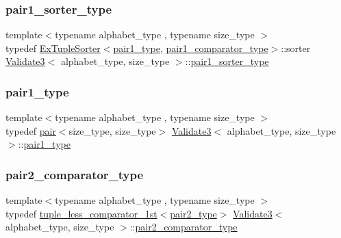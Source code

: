 \mbox{\label{class_validate3_a6b5f6c01fe108e6c572c52249bf37caa}} 
\subsubsection{\texorpdfstring{pair1\+\_\+sorter\+\_\+type}{pair1\_sorter\_type}}
{\footnotesize\ttfamily template$<$typename alphabet\+\_\+type , typename size\+\_\+type $>$ \\
typedef \hyperlink{struct_ex_tuple_sorter}{Ex\+Tuple\+Sorter}$<$\hyperlink{class_validate3_abecec0e807ea06aac66c60387611e78a}{pair1\+\_\+type}, \hyperlink{class_validate3_ace20fdc998ec6fb2c559aaf7413d464e}{pair1\+\_\+comparator\+\_\+type}$>$\+::sorter \hyperlink{class_validate3}{Validate3}$<$ alphabet\+\_\+type, size\+\_\+type $>$\+::\hyperlink{class_validate3_a6b5f6c01fe108e6c572c52249bf37caa}{pair1\+\_\+sorter\+\_\+type}\hspace{0.3cm}{\ttfamily [private]}}

\mbox{\label{class_validate3_abecec0e807ea06aac66c60387611e78a}} 
\subsubsection{\texorpdfstring{pair1\+\_\+type}{pair1\_type}}
{\footnotesize\ttfamily template$<$typename alphabet\+\_\+type , typename size\+\_\+type $>$ \\
typedef \hyperlink{structpair}{pair}$<$size\+\_\+type, size\+\_\+type$>$ \hyperlink{class_validate3}{Validate3}$<$ alphabet\+\_\+type, size\+\_\+type $>$\+::\hyperlink{class_validate3_abecec0e807ea06aac66c60387611e78a}{pair1\+\_\+type}\hspace{0.3cm}{\ttfamily [private]}}

\mbox{\label{class_validate3_a9a5316faa3c44f8f5743fec09cdea491}} 
\subsubsection{\texorpdfstring{pair2\+\_\+comparator\+\_\+type}{pair2\_comparator\_type}}
{\footnotesize\ttfamily template$<$typename alphabet\+\_\+type , typename size\+\_\+type $>$ \\
typedef \hyperlink{structtuple__less__comparator__1st}{tuple\+\_\+less\+\_\+comparator\+\_\+1st}$<$\hyperlink{class_validate3_aa5a02458227330cbaaf91b58684625f0}{pair2\+\_\+type}$>$ \hyperlink{class_validate3}{Validate3}$<$ alphabet\+\_\+type, size\+\_\+type $>$\+::\hyperlink{class_validate3_a9a5316faa3c44f8f5743fec09cdea491}{pair2\+\_\+comparator\+\_\+type}\hspace{0.3cm}{\ttfamily [private]}}

